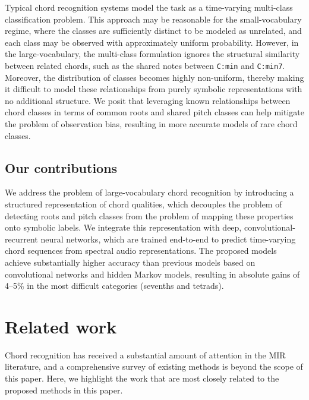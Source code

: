 \documentclass{article}
\begin{document}
Typical chord recognition systems model the task as a time-varying multi-class classification problem.
This approach may be reasonable for the small-vocabulary regime, where the classes are sufficiently distinct to be modeled as unrelated, and each class may be observed with approximately uniform probability.
However, in the large-vocabulary, the multi-class formulation ignores the structural similarity between related chords, such as the shared notes between \texttt{C:min} and \texttt{C:min7}.
Moreover, the distribution of classes becomes highly non-uniform, thereby making it difficult to model these relationships from purely symbolic representations with no additional structure.
We posit that leveraging known relationships between chord classes in terms of common roots and shared pitch classes can help mitigate the problem of observation bias, resulting in more accurate models of rare chord classes.

\subsection{Our contributions}

We address the problem of large-vocabulary chord recognition by introducing a structured representation of chord qualities, which decouples the problem of detecting roots and pitch classes from the problem of mapping these properties onto symbolic labels.
We integrate this representation with deep, convolutional-recurrent neural networks, which are trained end-to-end to predict time-varying chord sequences from spectral audio representations.
The proposed models achieve substantially higher accuracy than previous models based on convolutional networks and hidden Markov models, resulting in absolute gains of 4--5\% in the most difficult categories (sevenths and tetrads).

%
\section{Related work}

Chord recognition has received a substantial amount of attention in the MIR literature, and a comprehensive survey of existing methods is beyond the scope of this paper.
Here, we highlight the work that are most closely related to the proposed methods in this paper.
\end{document}
